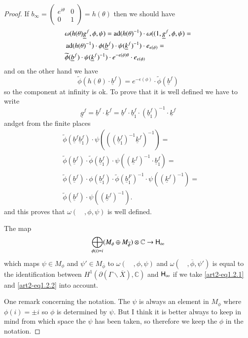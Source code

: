 \begin{proof}
If $b_{\infty}=\left(\begin{matrix} e^{i\theta} & 0\\ 0 & 1\end{matrix}\right)=h(\theta)$ then we should have
\begin{align*}
& \omega(h(\theta)\underline{g}^{f},\phi,\psi)=\operatorname{ad}(h(\theta)^{-1})\cdot \omega((1,\underline{g}^{f},\phi,\psi)=\\
& \operatorname{ad}(h(\theta)^{-1})\cdot \phi(\underline{b}^{f})\cdot \psi(\underline{k}^{f})^{-1})\cdot e_{\epsilon(\phi)}=\\
& \widetilde{\phi}(\underline{b}^{f})\cdot \psi(\underline{k}^{f})^{-1})\cdot e^{-\epsilon(\phi)\theta}\cdot e_{\epsilon(\phi)}
\end{align*}
and on the other hand we have
$$
\widetilde{\phi}(h(\theta)\cdot \underline{b}^{f})=e^{-\epsilon(\phi)}\cdot \widetilde{\phi}(\underline{b}^{f})
$$
so the component at infinity is ok. To prove that it is well defined we have to write
$$
\underline{g}^{f}=\underline{b}^{f}\cdot \underline{k}^{f}=\underline{b}^{f}\cdot \underline{b}^{f}_{1}\cdot (\underline{b}^{f}_{1})^{-1}\cdot \underline{k}^{f}
$$
and\pageoriginale get from the finite places
\begin{align*}
& \widetilde{\phi}(\underline{b}^{f}\underline{b}^{f}_{1})\cdot \psi(((\underline{b}^{f}_{1})^{-1}\underline{k}^{f})^{-1})=\\
& \widetilde{\phi}(\underline{b}^{f})\cdot \widetilde{\phi}(\underline{b}^{f}_{1})\cdot \psi((\underline{k}^{f})^{-1}\cdot \underline{b}^{f}_{1})=\\
& \widetilde{\phi}(\underline{b}^{f})\cdot \phi(\underline{b}^{f}_{1})\cdot \widetilde{\phi}(\underline{b}^{F}_{1})^{-1}\cdot \psi((\underline{k}^{f})^{-1})=\\
&\widetilde{\phi}(\underline{b}^{f})\cdot \psi((\underline{k}^{f})^{-1}).
\end{align*}
and this proves that $\omega(\quad,\phi,\psi)$ is well defined.

The map
$$
\bigoplus\limits_{\phi(i)=i}(M_{\phi}\oplus M_{\overline{\phi}})\otimes \mathbb{C}\to \mathsf{H}_{\infty}
$$
which maps $\psi\in M_{\phi}$ and $\psi'\in M_{\overline{\phi}}$ to $\omega(\quad,\phi,\psi)$ and $\omega(\quad,\overline{\phi},\psi')$ is equal to the identification between $H^{1}(\partial(\Gamma\backslash\overline{X}),\mathbb{C})$ and $\mathsf{H}_{\infty}$ if we take \eqref{art2-eq1.2.1} and \eqref{art2-eq1.2.2} into account.

One remark concerning the notation. The $\psi$ is always an element in $M_{\phi}$ where $\phi(i)=\pm i$ so $\phi$ is determined by $\psi$. But I think it is better always to keep in mind from which space the $\psi$ has been taken, so therefore we keep the $\phi$ in the notation.
\end{proof}

